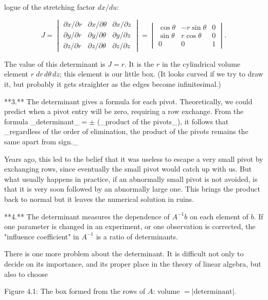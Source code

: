 logue of the stretching factor \(dx/du\):

\[J=\begin{vmatrix}\partial x/\partial r&\partial x/\partial\theta&\partial x/ \partial z\\ \partial y/\partial r&\partial y/\partial\theta&\partial y/\partial z\\ \partial z/\partial r&\partial z/\partial\theta&\partial z/\partial z\end{vmatrix} =\begin{vmatrix}\cos\theta&-r\sin\theta&0\\ \sin\theta&r\cos\theta&0\\ 0&0&1\end{vmatrix}.\]

The value of this determinant is \(J=r\). It is the \(r\) in the cylindrical volume element \(r\;dr\,d\theta\,dz\); this element is our little box. (It looks curved if we try to draw it, but probably it gets straighter as the edges become infinitesimal.)

**3.** The determinant gives a formula for each pivot. Theoretically, we could predict when a pivot entry will be zero, requiring a row exchange. From the formula _determinant_\(=\pm\) (_product of the pivots_), it follows that _regardless of the order of elimination, the product of the pivots remains the same apart from sign._

Years ago, this led to the belief that it was useless to escape a very small pivot by exchanging rows, since eventually the small pivot would catch up with us. But what usually happens in practice, if an abnormally small pivot is not avoided, is that it is very soon followed by an abnormally large one. This brings the product back to normal but it leaves the numerical solution in ruins.

**4.** The determinant measures the dependence of \(A^{-1}b\) on each element of \(b\). If one parameter is changed in an experiment, or one observation is corrected, the "influence coefficient" in \(A^{-1}\) is a ratio of determinants.

There is one more problem about the determinant. It is difficult not only to decide on its importance, and its proper place in the theory of linear algebra, but also to choose

Figure 4.1: The box formed from the rows of \(A\): volume \(=|\text{determinant}|\).

 